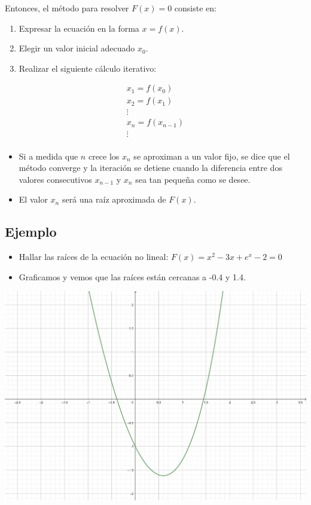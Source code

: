 \documentclass[]{book}
\providecommand{\tightlist}{%
  \setlength{\itemsep}{0pt}\setlength{\parskip}{0pt}}
\begin{document}
Entonces, el método para resolver \(F(x) = 0\) consiste en:

\begin{enumerate}
\def\labelenumi{\arabic{enumi}.}
\tightlist
\item
  Expresar la ecuación en la forma \(x = f(x)\).
\item
  Elegir un valor inicial adecuado \(x_0\).
\item
  Realizar el siguiente cálculo iterativo:
\end{enumerate}

\begin{gather*}
x_1 = f(x_0) \\
x_2 = f(x_1) \\
\vdots \\
x_n = f(x_{n-1}) \\
\vdots \\
\end{gather*}

\begin{itemize}
\tightlist
\item
  Si a medida que \(n\) crece los \(x_n\) se aproximan a un valor fijo, se dice que el método converge y la iteración se detiene cuando la diferencia entre dos valores consecutivos \(x_{n-1}\) y \(x_n\) sea tan pequeña como se desee.
\item
  El valor \(x_n\) será una raíz aproximada de \(F(x)\).
\end{itemize}

\hypertarget{ejemplo}{%
\subsection{Ejemplo}\label{ejemplo}}

\begin{itemize}
\tightlist
\item
  Hallar las raíces de la ecuación no lineal: \(F(x) = x^2-3x+e^x-2=0\)
\item
  Graficamos y vemos que las raíces están cercanas a -0.4 y 1.4.
\end{itemize}

\begin{center}\includegraphics[width=0.7\linewidth]{Plots/U2/f1} \end{center}
\end{document}

